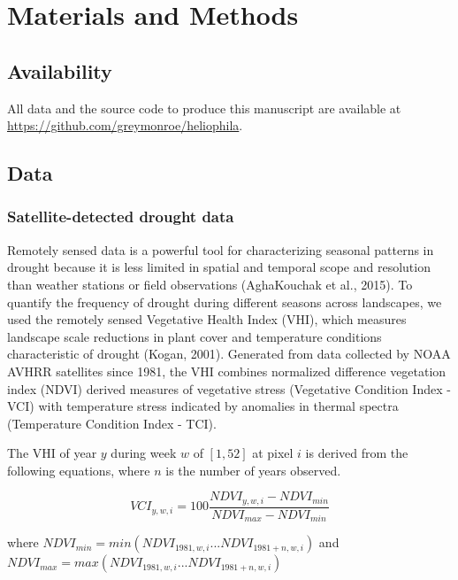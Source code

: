 \documentclass[man,floatsintext]{apa6}
\theoremstyle{definition}
\theoremstyle{definition}
\theoremstyle{definition}
\theoremstyle{remark}
\begin{document}
\hypertarget{materials-and-methods}{%
\section{Materials and Methods}\label{materials-and-methods}}

\hypertarget{availability}{%
\subsection{Availability}\label{availability}}

All data and the source code to produce this manuscript are available at
\url{https://github.com/greymonroe/heliophila}.

\hypertarget{data}{%
\subsection{Data}\label{data}}

\hypertarget{satellite-detected-drought-data}{%
\subsubsection{Satellite-detected drought
data}\label{satellite-detected-drought-data}}

Remotely sensed data is a powerful tool for characterizing seasonal
patterns in drought because it is less limited in spatial and temporal
scope and resolution than weather stations or field observations
(AghaKouchak et al., 2015). To quantify the frequency of drought during
different seasons across landscapes, we used the remotely sensed
Vegetative Health Index (VHI), which measures landscape scale reductions
in plant cover and temperature conditions characteristic of drought
(Kogan, 2001). Generated from data collected by NOAA AVHRR satellites
since 1981, the VHI combines normalized difference vegetation index
(NDVI) derived measures of vegetative stress (Vegetative Condition Index
- VCI) with temperature stress indicated by anomalies in thermal spectra
(Temperature Condition Index - TCI).

The VHI of year \(y\) during week \(w\) of \([1,52]\) at pixel \(i\) is
derived from the following equations, where \(n\) is the number of years
observed.

\[VCI_{y,w,i} = 100\frac{NDVI_{y,w,i} - NDVI_{min}}{NDVI_{max} - NDVI_{min}}\]

where \(NDVI_{min} = min(NDVI_{1981,w,i}...NDVI_{1981+n,w,i})\) and
\(NDVI_{max} = max(NDVI_{1981,w,i}...NDVI_{1981+n,w,i})\)
\end{document}
